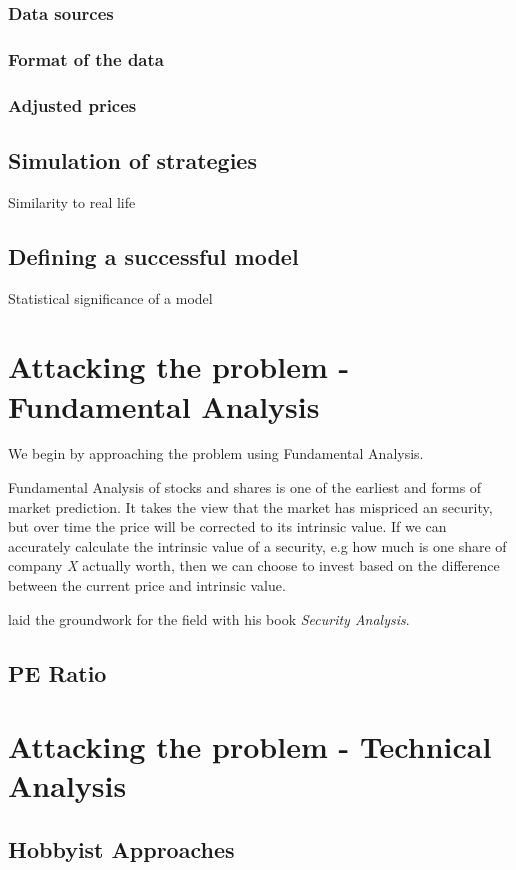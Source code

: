 \documentclass[a4paper,11pt]{article}
\begin{document}
\subsubsection{Data sources}
\subsubsection{Format of the data}
\subsubsection{Adjusted prices}

\subsection{Simulation of strategies}
Similarity to real life

\subsection{Defining a successful model}
Statistical significance of a model

\section{Attacking the problem - Fundamental Analysis}

We begin by approaching the problem using Fundamental Analysis. 

Fundamental Analysis of stocks and shares is one of the earliest and forms of market prediction. It takes the view that the market has mispriced an security, but over time the price will be corrected to its intrinsic value. If we can accurately calculate the intrinsic value of a security, e.g how much is one share of company \textit{X} actually worth, then we can choose to invest based on the difference between the current price and intrinsic value. 

\citet{graham1934security} laid the groundwork for the field with his book \textit{Security Analysis}.

\subsection{PE Ratio}

\section{Attacking the problem - Technical Analysis}
\subsection{Hobbyist Approaches}
\end{document}
